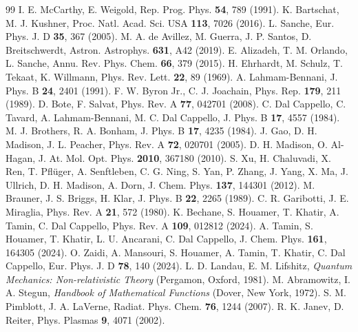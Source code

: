 \documentclass[11pt,a4paper]{article}
\begin{document}
\begin{thebibliography}{99}\small
{} I. E. McCarthy, E. Weigold, Rep. Prog. Phys. \textbf{54}, 789 (1991).
 K. Bartschat, M. J. Kushner, Proc. Natl. Acad. Sci. USA \textbf{113}, 7026 (2016).
 L. Sanche, Eur. Phys. J. D \textbf{35}, 367 (2005).
 M. A. de Avillez, M. Guerra, J. P. Santos, D. Breitschwerdt, Astron. Astrophys. \textbf{631}, A42 (2019).
 E. Alizadeh, T. M. Orlando, L. Sanche, Annu. Rev. Phys. Chem. \textbf{66}, 379 (2015).
 H. Ehrhardt, M. Schulz, T. Tekaat, K. Willmann, Phys. Rev. Lett. \textbf{22}, 89 (1969).
 A. Lahmam-Bennani, J. Phys. B \textbf{24}, 2401 (1991).
 F. W. Byron Jr., C. J. Joachain, Phys. Rep. \textbf{179}, 211 (1989).
 D. Bote, F. Salvat, Phys. Rev. A \textbf{77}, 042701 (2008).
 C. Dal Cappello, C. Tavard, A. Lahmam-Bennani, M. C. Dal Cappello, J. Phys. B \textbf{17}, 4557 (1984).
 M. J. Brothers, R. A. Bonham, J. Phys. B \textbf{17}, 4235 (1984).
 J. Gao, D. H. Madison, J. L. Peacher, Phys. Rev. A \textbf{72}, 020701 (2005).
 D. H. Madison, O. Al-Hagan, J. At. Mol. Opt. Phys. \textbf{2010}, 367180 (2010).
 S. Xu, H. Chaluvadi, X. Ren, T. Pfl\"uger, A. Senftleben, C. G. Ning, S. Yan, P. Zhang, J. Yang, X. Ma, J. Ullrich, D. H. Madison, A. Dorn, J. Chem. Phys. \textbf{137}, 144301 (2012).
 M. Brauner, J. S. Briggs, H. Klar, J. Phys. B \textbf{22}, 2265 (1989).
 C. R. Garibotti, J. E. Miraglia, Phys. Rev. A \textbf{21}, 572 (1980).
 K. Bechane, S. Houamer, T. Khatir, A. Tamin, C. Dal Cappello, Phys. Rev. A \textbf{109}, 012812 (2024).
 A. Tamin, S. Houamer, T. Khatir, L. U. Ancarani, C. Dal Cappello, J. Chem. Phys. \textbf{161}, 164305 (2024).
 O. Zaidi, A. Mansouri, S. Houamer, A. Tamin, T. Khatir, C. Dal Cappello, Eur. Phys. J. D \textbf{78}, 140 (2024).
 L. D. Landau, E. M. Lifshitz, \emph{Quantum Mechanics: Non-relativistic Theory} (Pergamon, Oxford, 1981).
 M. Abramowitz, I. A. Stegun, \emph{Handbook of Mathematical Functions} (Dover, New York, 1972).
 S. M. Pimblott, J. A. LaVerne, Radiat. Phys. Chem. \textbf{76}, 1244 (2007).
 R. K. Janev, D. Reiter, Phys. Plasmas \textbf{9}, 4071 (2002).

\end{thebibliography}
\end{document}
